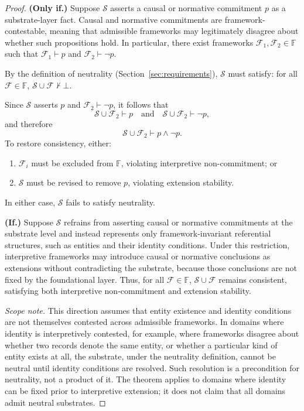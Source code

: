 \begin{proof}
\textbf{(Only if.)}
Suppose $\mathcal{S}$ asserts a causal or normative commitment $p$
as a substrate-layer fact.
Causal and normative commitments are framework-contestable,
meaning that admissible frameworks may legitimately disagree
about whether such propositions hold.
In particular, there exist frameworks
$\mathcal{F}_1, \mathcal{F}_2 \in \mathbb{F}$
such that $\mathcal{F}_1 \vdash p$ and
$\mathcal{F}_2 \vdash \neg p$.

By the definition of neutrality (Section~\ref{sec:requirements}),
$\mathcal{S}$ must satisfy:
for all $\mathcal{F} \in \mathbb{F}$,
$\mathcal{S} \cup \mathcal{F} \not\vdash \bot$.

Since $\mathcal{S}$ asserts $p$ and
$\mathcal{F}_2 \vdash \neg p$,
it follows that
\[
\mathcal{S} \cup \mathcal{F}_2 \vdash p
\quad\text{and}\quad
\mathcal{S} \cup \mathcal{F}_2 \vdash \neg p,
\]
and therefore
\[
\mathcal{S} \cup \mathcal{F}_2 \vdash p \land \neg p.
\]
To restore consistency, either:
\begin{enumerate}
  \item[(i)] $\mathcal{F}_i$ must be excluded from $\mathbb{F}$,
        violating interpretive non-commitment; or
  \item[(ii)] $\mathcal{S}$ must be revised to remove $p$,
        violating extension stability.
\end{enumerate}
In either case, $\mathcal{S}$ fails to satisfy neutrality.

\medskip
\textbf{(If.)}
Suppose $\mathcal{S}$ refrains from asserting causal or normative commitments
at the substrate level and instead represents only
framework-invariant referential structures,
such as entities and their identity conditions.
Under this restriction,
interpretive frameworks may introduce causal or normative
conclusions as extensions without contradicting the substrate,
because those conclusions are not fixed by the foundational layer.
Thus, for all $\mathcal{F} \in \mathbb{F}$,
$\mathcal{S} \cup \mathcal{F}$ remains consistent,
satisfying both interpretive non-commitment and extension stability.

\medskip
\noindent
\textit{Scope note.}
This direction assumes that entity existence and identity conditions
are not themselves contested across admissible frameworks.
In domains where identity is interpretively contested, for example,
where frameworks disagree about whether two records denote the same entity,
or whether a particular kind of entity exists at all,
the substrate, under the neutrality definition,
cannot be neutral until identity conditions are resolved.
Such resolution is a precondition for neutrality, not a product of it.
The theorem applies to domains where identity can be fixed
prior to interpretive extension;
it does not claim that all domains admit neutral substrates.
\end{proof}

